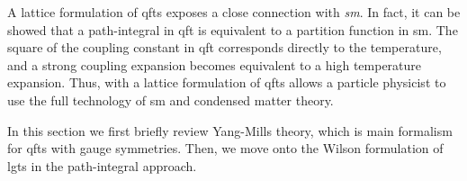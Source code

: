 A lattice formulation of \ac{qft}s exposes a close connection with \emph{\ac{sm}}.
In fact, it can be showed that a path-integral in \ac{qft} is equivalent to a partition function in \ac{sm}.
The square of the coupling constant in \ac{qft} corresponds directly to the temperature, and a strong coupling expansion becomes equivalent to a high temperature expansion.
Thus, with a lattice formulation of \ac{qft}s allows a particle physicist to use the full technology of \ac{sm} and condensed matter theory.


\medskip

In this section we first briefly review Yang-Mills theory, which is main formalism for \ac{qft}s with gauge symmetries.
Then, we move onto the Wilson formulation of \ac{lgt}s in the path-integral approach.





